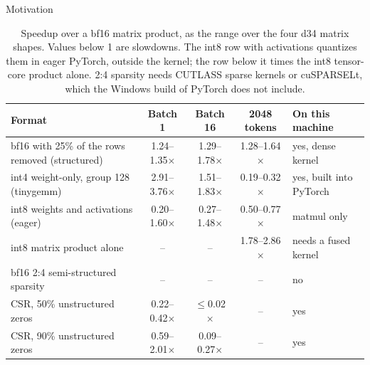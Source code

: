 \documentclass[aspectratio=169,10pt]{beamer}
\begin{document}
\begin{frame}{Motivation}{}
\begin{table}
\centering
\begin{adjustbox}{width=\linewidth, totalheight=0.64\textheight, keepaspectratio, center}
\centering
\footnotesize
\begin{tabular}{P{4.3cm}cccP{2.6cm}}
\toprule
Format & Batch 1 & Batch 16 & 2048 tokens & On this machine \\
\midrule
bf16 with 25\% of the rows removed (structured) & 1.24--1.35$\times$ & 1.29--1.78$\times$ & 1.28--1.64$\times$ & yes, dense kernel \\
int4 weight-only, group 128 (tinygemm)          & 2.91--3.76$\times$ & 1.51--1.83$\times$ & 0.19--0.32$\times$ & yes, built into PyTorch \\
int8 weights and activations (eager)            & 0.20--1.60$\times$ & 0.27--1.48$\times$ & 0.50--0.77$\times$ & matmul only \\
int8 matrix product alone                       & --                 & --                 & 1.78--2.86$\times$ & needs a fused kernel \\
bf16 2:4 semi-structured sparsity               & --                 & --                 & --                 & no \\
CSR, 50\% unstructured zeros                    & 0.22--0.42$\times$ & $\le$0.02$\times$  & --                 & yes \\
CSR, 90\% unstructured zeros                    & 0.59--2.01$\times$ & 0.09--0.27$\times$ & --                 & yes \\
\bottomrule
\end{tabular}
\end{adjustbox}
\caption{Speedup over a bf16 matrix product, as the range over the four d34 matrix shapes. Values below
1 are slowdowns. The int8 row with activations quantizes them in eager PyTorch, outside the kernel; the
row below it times the int8 tensor-core product alone. 2:4 sparsity needs CUTLASS sparse kernels or
cuSPARSELt, which the Windows build of PyTorch does not include.}\label{tab:menu}
\end{table}
\end{frame}
\end{document}
